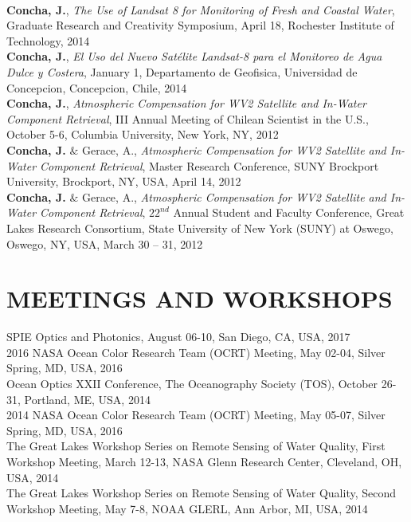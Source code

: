 \documentclass[11pt]{res} %
\begin{document}
\begin{resume}
\vspace{0.1in}\\
{\bf Concha, J.}, {\it The Use of Landsat 8 for Monitoring of Fresh and Coastal Water}, Graduate Research and Creativity Symposium, April 18, Rochester Institute of Technology, 2014
\vspace{0.1in}\\
{\bf Concha, J.}, {\it El Uso del Nuevo Satélite Landsat-8 para el Monitoreo de Agua Dulce y Costera}, January 1, Departamento de Geofisica, Universidad de Concepcion, Concepcion, Chile, 2014
\vspace{0.1in}\\
{\bf Concha, J.}, {\it Atmospheric Compensation for WV2 Satellite and In-Water Component Retrieval}, III Annual Meeting of Chilean Scientist in the U.S., October 5-6, Columbia University, New York, NY, 2012
\vspace{0.1in}\\
{\bf Concha, J.} $\&$ Gerace, A., {\it Atmospheric Compensation for WV2 Satellite and In-Water Component Retrieval}, Master Research Conference, SUNY Brockport University, Brockport, NY, USA, April 14, 2012
\vspace{0.1in}\\
{\bf Concha, J.} $\&$ Gerace, A., {\it Atmospheric Compensation for WV2 Satellite and In-Water Component Retrieval}, $22^{nd}$ Annual Student and Faculty Conference, Great Lakes Research Consortium, State University of New York (SUNY) at Oswego, Oswego, NY, USA, March 30 -- 31, 2012\\

\vspace{-0.2in}
\section{MEETINGS AND WORKSHOPS}
\vspace{0.1in}
SPIE Optics and Photonics,  August 06-10, San Diego, CA, USA, 2017
\vspace{0.1in}\\
2016 NASA Ocean Color Research Team (OCRT) Meeting,  May 02-04, Silver Spring, MD, USA, 2016
\vspace{0.1in}\\
Ocean Optics XXII Conference, The Oceanography Society (TOS),  October 26-31, Portland, ME, USA, 2014
\vspace{0.1in}\\
2014 NASA Ocean Color Research Team (OCRT) Meeting,  May 05-07, Silver Spring, MD, USA, 2016
\vspace{0.1in}\\
The Great Lakes Workshop Series on Remote Sensing of Water Quality, First Workshop Meeting, March 12-13, NASA Glenn Research Center, Cleveland, OH, USA, 2014
\vspace{0.1in}\\
The Great Lakes Workshop Series on Remote Sensing of Water Quality, Second Workshop Meeting, May 7-8, NOAA GLERL, Ann Arbor, MI, USA, 2014\\



\end{resume}
\end{document}
